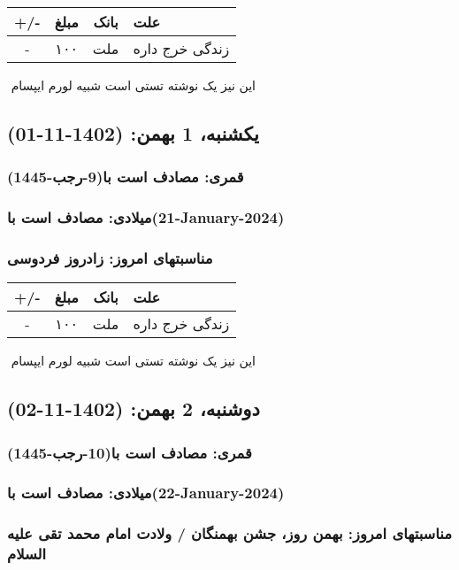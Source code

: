 \documentclass{article}
\newcommand{\rnote}[1]{\marginpar{\textcolor{color}{\StrSubstitute{\##1}{ }{\_}}}}
\newcommand{\myRow}[4]{
    #1 & #2 & #3 & #4 \\ \hline
}
\begin{document}
\begin{tabular}{ | c | c | c | p{5cm} |}
    \hline
    \myRow{ +/- }{مبلغ}{بانک}{علت}
    \myRow{-}{۱۰۰}{ملت}{زندگی خرج داره}
\end{tabular}
\newline
\newline

‌
\rnote{تست}
این نیز یک نوشته تستی است شبیه لورم ایپسام




\newpage
{}
\textcolor{color}{
\section{ یکشنبه، 1 بهمن: (1402-11-01) }
\subsubsection*{قمری: مصادف است با(9-رجب-1445)} 
\subsubsection*{میلادی: مصادف است با(21-January-2024)}
\subsubsection*{مناسبتهای امروز: زادروز فردوسی}
}


\begin{tabular}{ | c | c | c | p{5cm} |}
    \hline
    \myRow{ +/- }{مبلغ}{بانک}{علت}
    \myRow{-}{۱۰۰}{ملت}{زندگی خرج داره}
\end{tabular}
\newline
\newline

‌
\rnote{تست}
این نیز یک نوشته تستی است شبیه لورم ایپسام




\newpage
{}
\textcolor{color}{
\section{ دوشنبه، 2 بهمن: (1402-11-02) }
\subsubsection*{قمری: مصادف است با(10-رجب-1445)} 
\subsubsection*{میلادی: مصادف است با(22-January-2024)}
\subsubsection*{مناسبتهای امروز: بهمن روز، جشن بهمنگان / ولادت امام محمد تقی علیه السلام}
}
\end{document}
